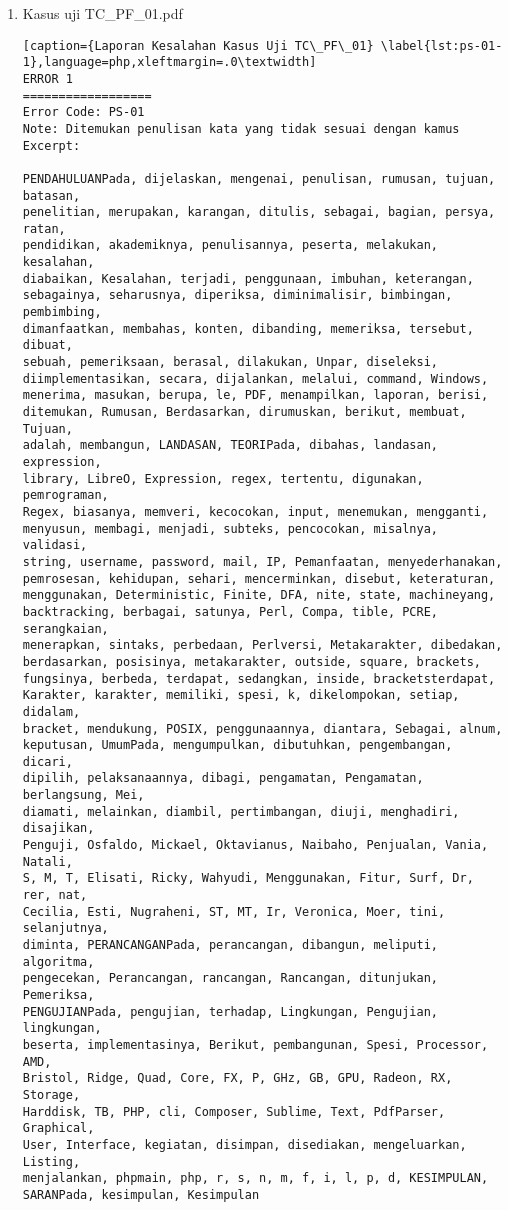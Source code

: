 \begin{enumerate}

	\item Kasus uji TC\_PF\_01.pdf
	
\begin{lstlisting}[caption={Laporan Kesalahan Kasus Uji TC\_PF\_01}	\label{lst:ps-01-1},language=php,xleftmargin=.0\textwidth]
ERROR 1
==================
Error Code: PS-01
Note: Ditemukan penulisan kata yang tidak sesuai dengan kamus
Excerpt: 

PENDAHULUANPada, dijelaskan, mengenai, penulisan, rumusan, tujuan, batasan, 
penelitian, merupakan, karangan, ditulis, sebagai, bagian, persya, ratan,
pendidikan, akademiknya, penulisannya, peserta, melakukan, kesalahan,
diabaikan, Kesalahan, terjadi, penggunaan, imbuhan, keterangan, 
sebagainya, seharusnya, diperiksa, diminimalisir, bimbingan, pembimbing, 
dimanfaatkan, membahas, konten, dibanding, memeriksa, tersebut, dibuat, 
sebuah, pemeriksaan, berasal, dilakukan, Unpar, diseleksi, 
diimplementasikan, secara, dijalankan, melalui, command, Windows, 
menerima, masukan, berupa, le, PDF, menampilkan, laporan, berisi, 
ditemukan, Rumusan, Berdasarkan, dirumuskan, berikut, membuat, Tujuan, 
adalah, membangun, LANDASAN, TEORIPada, dibahas, landasan, expression, 
library, LibreO, Expression, regex, tertentu, digunakan, pemrograman, 
Regex, biasanya, memveri, kecocokan, input, menemukan, mengganti, 
menyusun, membagi, menjadi, subteks, pencocokan, misalnya, validasi, 
string, username, password, mail, IP, Pemanfaatan, menyederhanakan, 
pemrosesan, kehidupan, sehari, mencerminkan, disebut, keteraturan, 
menggunakan, Deterministic, Finite, DFA, nite, state, machineyang, 
backtracking, berbagai, satunya, Perl, Compa, tible, PCRE, serangkaian, 
menerapkan, sintaks, perbedaan, Perlversi, Metakarakter, dibedakan, 
berdasarkan, posisinya, metakarakter, outside, square, brackets, 
fungsinya, berbeda, terdapat, sedangkan, inside, bracketsterdapat, 
Karakter, karakter, memiliki, spesi, k, dikelompokan, setiap, didalam, 
bracket, mendukung, POSIX, penggunaannya, diantara, Sebagai, alnum, 
keputusan, UmumPada, mengumpulkan, dibutuhkan, pengembangan, dicari, 
dipilih, pelaksanaannya, dibagi, pengamatan, Pengamatan, berlangsung, Mei, 
diamati, melainkan, diambil, pertimbangan, diuji, menghadiri, disajikan, 
Penguji, Osfaldo, Mickael, Oktavianus, Naibaho, Penjualan, Vania, Natali, 
S, M, T, Elisati, Ricky, Wahyudi, Menggunakan, Fitur, Surf, Dr, rer, nat, 
Cecilia, Esti, Nugraheni, ST, MT, Ir, Veronica, Moer, tini, selanjutnya, 
diminta, PERANCANGANPada, perancangan, dibangun, meliputi, algoritma, 
pengecekan, Perancangan, rancangan, Rancangan, ditunjukan, Pemeriksa, 
PENGUJIANPada, pengujian, terhadap, Lingkungan, Pengujian, lingkungan, 
beserta, implementasinya, Berikut, pembangunan, Spesi, Processor, AMD, 
Bristol, Ridge, Quad, Core, FX, P, GHz, GB, GPU, Radeon, RX, Storage, 
Harddisk, TB, PHP, cli, Composer, Sublime, Text, PdfParser, Graphical, 
User, Interface, kegiatan, disimpan, disediakan, mengeluarkan, Listing, 
menjalankan, phpmain, php, r, s, n, m, f, i, l, p, d, KESIMPULAN, 
SARANPada, kesimpulan, Kesimpulan
\end{lstlisting}
	

\end{enumerate}
